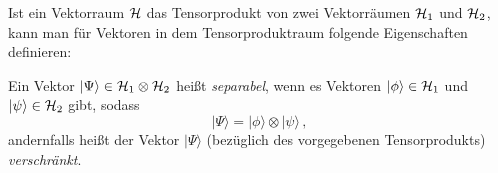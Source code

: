 Ist ein Vektorraum ${\cal H}$ das Tensorprodukt von zwei
Vektorr\"aumen ${\cal H}_1$ und ${\cal H}_2$, kann man
f\"ur Vektoren in dem Tensorproduktraum folgende Eigenschaften definieren:

Ein Vektor $|\Psi\rangle\in {\cal H}_1 \otimes {\cal H}_2$ 
hei\ss t {\em separabel},
wenn es Vektoren $|\phi\rangle \in {\cal H}_1$ und 
$|\psi\rangle \in {\cal H}_2$ gibt, sodass
\begin{equation}
       | \Psi \rangle = |\phi \rangle \otimes |\psi \rangle  \, ,
\end{equation}
andernfalls hei\ss t der Vektor $|\Psi\rangle$ (bez\"uglich des
vorgegebenen Tensorprodukts) 
{\em verschr\"ankt}.

